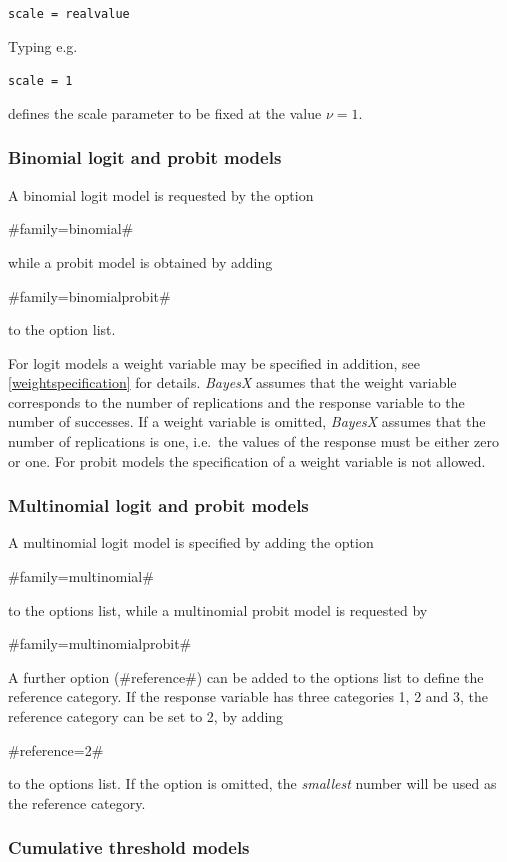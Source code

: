 {\tt scale = realvalue}

Typing e.g.

{\tt scale = 1}

defines the scale parameter to be fixed at the value $\nu=1$.


\subsubsection*{Binomial logit and probit models}

A binomial logit model is requested by the option

#family=binomial#

while a probit model is obtained by adding

#family=binomialprobit#

to the option list.

For logit models a weight variable may be specified in addition,
see \autoref{weightspecification} for details. {\em BayesX}
assumes that the weight variable corresponds to the number of
replications and the response variable to the number of successes.
If a weight variable is omitted, {\em BayesX} assumes that the
number of replications is one, i.e.~the values of the response
must be either zero or one. For probit models the specification of
a weight variable is not allowed.


\subsubsection*{Multinomial logit and probit
models}

A multinomial logit model is specified by adding the option

#family=multinomial#

to the options list, while a multinomial probit model is requested
by

#family=multinomialprobit#

A further option (#reference#) can be added to the options list to
define the reference category. If the response variable has three
categories 1, 2 and 3, the reference category can be set to 2, by
adding

#reference=2#

to the options list. If the option is omitted, the {\em smallest}
number will be used as the reference category.

\subsubsection*{Cumulative threshold models}

